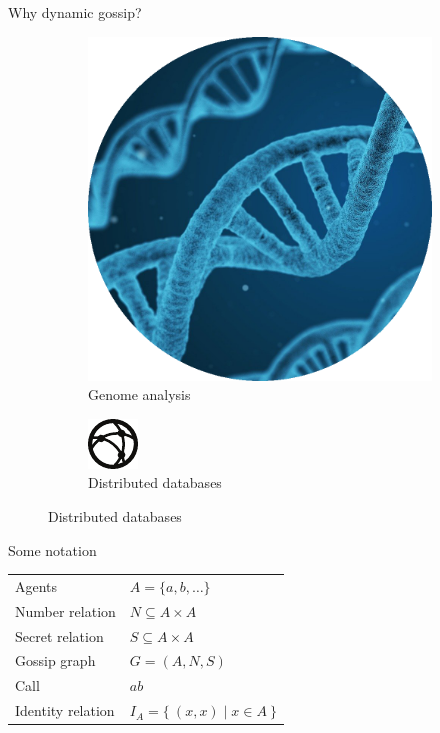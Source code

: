 \documentclass[aspectratio=169]{beamer}
\begin{document}
\begin{frame}[c]{Why dynamic gossip?}
\begin{figure}
      \bigskip

      \begin{subfigure}[t]{.3\paperwidth}
        \centering
        \includegraphics[height=.3\paperheight]{dna.png}
        \caption*{Genome analysis \cite{liben-nowell_gossip_2002}}
      \end{subfigure}
      \qquad
      \begin{subfigure}[t]{.3\paperwidth}
        \centering
        \includegraphics[height=.3\paperheight]{network.pdf}
        \caption*{Distributed databases \cite{das_swim_2002,decandia_dynamo_2007}}
      \end{subfigure}
    \end{figure}
\end{frame}
\begin{frame}[c]{Some notation}
    \centering\Large
    \begin{tabular}{ll}
         Agents          & $A = \{ a, b, \dots \}$\\\pause
         Number relation & $N \subseteq A \times A$\\\pause
         Secret relation & $S \subseteq A \times A$\\\pause
         Gossip graph    & $G = (A, N, S)$\\\pause
         Call            & $ab$\\\pause
         Identity relation & $I_A = \{\ (x, x) \mid x \in A\ \}$\\
    \end{tabular}
    \vfill
\end{frame}
\end{document}
